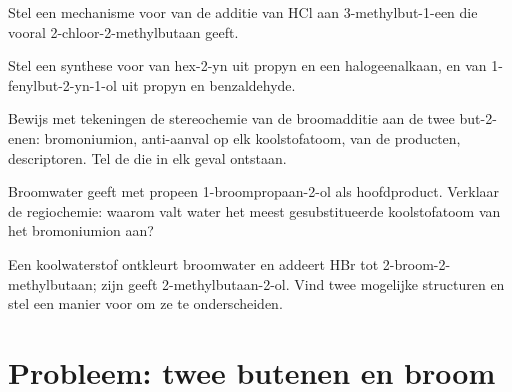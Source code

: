 \begin{exercise}[$\star\star$]\label{exo:b1:electrophilic-additions:8}
Stel een mechanisme voor van de additie van HCl aan 3-methylbut-1-een die
vooral 2-chloor-2-methylbutaan geeft.
\end{exercise}

\begin{exercise}[$\star\star$]\label{exo:b1:electrophilic-additions:9}
Stel een synthese voor van hex-2-yn uit propyn en een halogeenalkaan, en
van 1-fenylbut-2-yn-1-ol uit propyn en benzaldehyde.
\end{exercise}

\begin{exercise}[$\star\star\star$]\label{exo:b1:electrophilic-additions:10}
Bewijs met tekeningen de stereochemie van de broomadditie aan de twee
but-2-enen: bromoniumion, anti-aanval op elk koolstofatoom,  van de producten, descriptoren. Tel de  die
in elk geval ontstaan.
\end{exercise}

\begin{exercise}[$\star\star\star$]\label{exo:b1:electrophilic-additions:11}
Broomwater geeft met propeen 1-broompropaan-2-ol als hoofdproduct.
Verklaar de regiochemie: waarom valt water het meest gesubstitueerde
koolstofatoom van het bromoniumion aan?
\end{exercise}

\begin{exercise}[$\star\star\star$]\label{exo:b1:electrophilic-additions:12}
Een koolwaterstof  ontkleurt broomwater en addeert HBr tot
2-broom-2-methylbutaan; zijn  geeft 2-methylbutaan-2-ol. Vind
twee mogelijke structuren en stel een manier voor om ze te onderscheiden.
\end{exercise}

\section{Probleem: twee butenen en broom}

